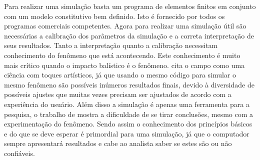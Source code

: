 Para realizar uma simulação basta um programa de elementos finitos em conjunto com um modelo constitutivo bem definido. Isto é fornecido por todos os programas comerciais competentes. Agora para realizar uma simulação útil são necessárias a calibração dos parâmetros da simulação e a correta interpretação de seus resultados. Tanto a interpretação quanto a calibração necessitam conhecimento do fenômeno que está acontecendo. Este conhecimento é muito mais crítico quando o impacto balístico é o fenômeno. \cite{Zukas} cita o campo como uma ciência com toques artísticos, já que usando o mesmo código para simular o mesmo fenômeno são possíveis inúmeros resultados finais, devido à diversidade de possíveis ajustes que muitas vezes precisam ser ajustados de acordo com a experiência do usuário. Além disso a simulação é apenas uma ferramenta para a pesquisa, o trabalho de \cite{kaufmann_cronin_worswick_pageau_beth_2003} mostra a dificuldade de se tirar conclusões, mesmo com a experimentação do fenômeno. Sendo assim o conhecimento dos princípios básicos e do que se deve esperar é primordial para uma simulação, já que o computador sempre apresentará resultados e cabe ao analista saber se estes são ou não confiáveis. \\